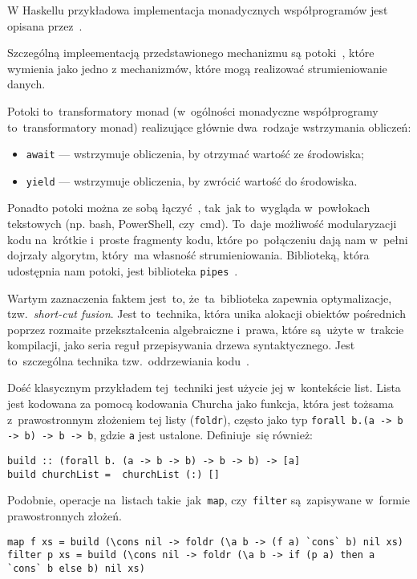 \documentclass[../../praca.tex]{subfiles}
\begin{document}
W Haskellu przykładowa implementacja monadycznych współprogramów jest opisana 
przez~\cite{Blazevic:CP}.

Szczególną impleementacją przedstawionego mechanizmu są potoki~\cite{Blazevic:CP},
które~\cite{Thomasson:HHPP} wymienia jako jedno z mechanizmów, które mogą realizować
strumieniowanie danych.

Potoki to~transformatory monad (w~ogólności monadyczne współprogramy 
to~transformatory monad)
realizujące głównie dwa~rodzaje wstrzymania obliczeń:
\begin{itemize}
  \item \texttt{await} --- wstrzymuje obliczenia, by otrzymać wartość ze środowiska;
  \item \texttt{yield} --- wstrzymuje obliczenia, by zwrócić wartość do środowiska.
\end{itemize}
Ponadto potoki można ze sobą łączyć~\cite{Blazevic:CP}, tak~jak to~wygląda 
w~powłokach tekstowych (np. bash, PowerShell, czy~cmd). To~daje możliwość
modularyzacji kodu na~krótkie i~proste fragmenty kodu, które po~połączeniu dają
nam w~pełni dojrzały algorytm, który~ma własność strumieniowania.
Biblioteką, która udostępnia nam potoki, 
jest biblioteka \texttt{pipes}~\cite{Hackage:Pipes}.

Wartym zaznaczenia faktem jest~to, że~ta~biblioteka zapewnia optymalizacje,
tzw.~\emph{short-cut fusion}. 
Jest to~technika, która unika alokacji obiektów pośrednich poprzez rozmaite
przekształcenia algebraiczne i~prawa, które są~użyte w~trakcie kompilacji,
jako seria reguł przepisywania drzewa syntaktycznego. Jest to~szczególna
technika tzw.~oddrzewiania kodu~\cite{Gill:SCD}.

Dość klasycznym przykładem tej~techniki jest użycie jej w~kontekście list.
Lista jest kodowana za pomocą kodowania Churcha jako funkcja, która jest
tożsama z~prawostronnym złożeniem tej listy (\texttt{foldr}), często jako typ
\texttt{forall b.(a -> b -> b) -> b -> b}, gdzie \texttt{a}
jest ustalone.
Definiuje~się również:
\begin{verbatim}
build :: (forall b. (a -> b -> b) -> b -> b) -> [a]
build churchList =  churchList (:) []
\end{verbatim}

Podobnie, operacje na~listach takie~jak~\texttt{map}, czy~\texttt{filter} 
są~zapisywane w~formie prawostronnych złożeń.

\begin{verbatim}
map f xs = build (\cons nil -> foldr (\a b -> (f a) `cons` b) nil xs)
filter p xs = build (\cons nil -> foldr (\a b -> if (p a) then a `cons` b else b) nil xs)
\end{verbatim}
\end{document}
